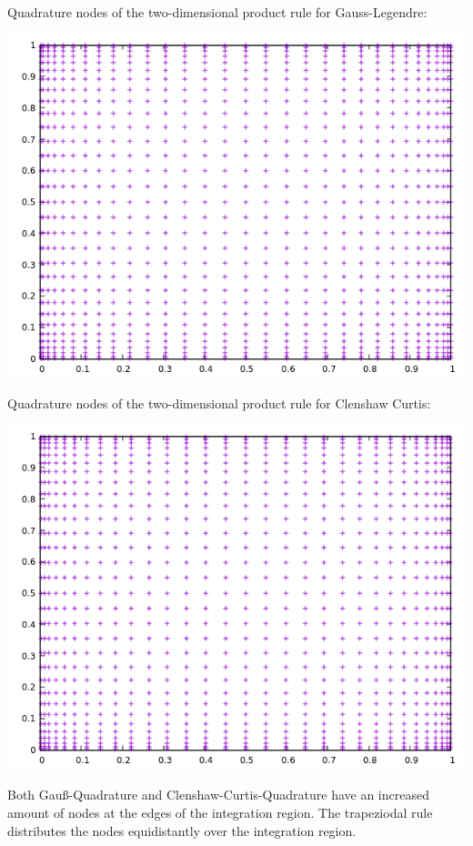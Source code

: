 \documentclass[10pt,a4paper]{article}
\begin{document}
Quadrature nodes of the two-dimensional product rule for Gauss-Legendre:
\begin{center}
\includegraphics[scale=0.5]{quadrature_nodes_gauss_legendre.png}		
\end{center}

Quadrature nodes of the two-dimensional product rule for Clenshaw Curtis:
\begin{center}
\includegraphics[scale=0.5]{quadrature_nodes_clenshaw_curtis.png}		
\end{center}

Both Gauß-Quadrature and Clenshaw-Curtis-Quadrature have an increased amount of nodes at the edges of the integration region. The trapeziodal rule distributes the nodes equidistantly over the integration region.
\end{document}
